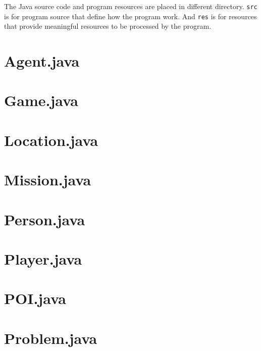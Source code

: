 \documentclass[letterpaper, 12pt]{report}
\begin{document}
The Java source code and program resources are placed in different directory.
\texttt{src} is for program source that define how the program work. And
\texttt{res} is for resources that provide meaningful resources to be processed
by the program.

\section{Agent.java}


\section{Game.java}


\section{Location.java}


\section{Mission.java}


\section{Person.java}


\section{Player.java}


\section{POI.java}


\section{Problem.java}

\end{document}
